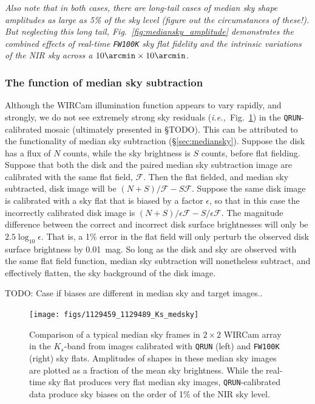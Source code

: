 \documentclass[iop]{emulateapj}
\newcommand{\ie}{\textit{i.e.,~}}
\newcommand{\todo}[1]{\textcolor{BurntOrange}{\textsf{#1}}} %
\newcommand{\mycomment}[1]{\textcolor{OliveGreen}{\textit{#1}}} %
\newcommand{\Fig}[1]{Fig.~\ref{fig:#1}}  %
\newcommand{\Sec}[1]{\S\ref{sec:#1}}  %
\begin{document}
\mycomment{Also note that in both cases, there are long-tail cases of median sky shape amplitudes as large as 5\% of the sky level \todo{(figure out the circumstances of these!)}.
But neglecting this long tail, \Fig{mediansky_amplitude} demonstrates the combined effects of real-time \texttt{FW100K} sky flat fidelity and the intrinsic variations of the NIR sky across a $10\arcmin \times 10\arcmin$.}

\subsubsection{The function of median sky subtraction}

Although the WIRCam illumination function appears to vary rapidly, and strongly, we do not see extremely strong sky residuals (\ie \Fig{median_sky_images}) in the \texttt{QRUN}-calibrated mosaic (ultimately presented in \todo{\S TODO}).
This can be attributed to the functionality of median sky subtraction (\Sec{mediansky}).
Suppose the disk has a flux of $N$ counts, while the sky brightness is $S$ counts, before flat fielding.
Suppose that both the disk and the paired median sky subtraction image are calibrated with the same flat field, $\mathcal{F}$.
Then the flat fielded, and median sky subtracted, disk image will be $(N + S)/\mathcal{F} - S \mathcal{F}$.
Suppose the same disk image is calibrated with a sky flat that is biased by a factor $\epsilon$, so that in this case the incorrectly calibrated disk image is $(N + S) / \epsilon \mathcal{F} - S / \epsilon \mathcal{F}$.
The magnitude difference between the correct and incorrect disk surface brightnesses will only be $2.5 \log_{10} \epsilon$.
That is, a 1\% error in the flat field will only perturb the observed disk surface brightness by 0.01~mag.
So long as the disk and sky are observed with the same flat field function, median sky subtraction will nonetheless subtract, and effectively flatten, the sky background of the disk image.

\todo{TODO: Case if biases are different in median sky and target images.}.

\begin{figure}[t]
\centering
\texttt{[image: figs/1129459\_1129489\_Ks\_medsky]}
\caption{Comparison of a typical median sky frames in $2\times 2$ WIRCam array in the $K_s$-band from images calibrated with \texttt{QRUN} (left) and \texttt{FW100K} (right) sky flats.
Amplitudes of shapes in these median sky images are plotted as a fraction of the mean sky brightness.
While the real-time sky flat produces very flat median sky images, \texttt{QRUN}-calibrated data produce sky biases on the order of 1\% of the NIR sky level.
}
\label{fig:median_sky_images}
\end{figure}
\end{document}
